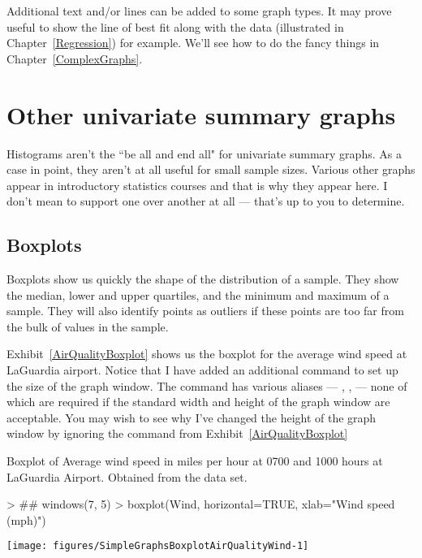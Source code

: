 Additional text and/or lines can be added to some graph types. It may prove useful to show the line of best fit along with the data (illustrated in Chapter~\ref{Regression}) for example. We'll see how to do the fancy things in Chapter~\ref{ComplexGraphs}. 
 
\section{Other univariate summary graphs} 
 
Histograms aren't the ``be all and end all" for univariate summary graphs. As a case in point, they aren't at all useful for small sample sizes. Various other graphs appear in introductory statistics courses and that is why they appear here. I don't mean to support one over another at all --- that's up to you to determine. 
 
\subsection{Boxplots} 
 
Boxplots show us quickly the shape of the distribution of a sample. They show the median, lower and upper quartiles, and the minimum and maximum of a sample. They will also identify points as outliers if these points are too far from the bulk of values in the sample. 
 
Exhibit~\ref{AirQualityBoxplot} shows us the boxplot for the average wind speed at LaGuardia airport. Notice that I have added an additional command to set up the size of the graph window. The  command has various aliases --- , ,  --- none of which are required if the standard width and height of the graph window are acceptable. You may wish to see why I've changed the height of the graph window by ignoring the  command from Exhibit~\ref{AirQualityBoxplot} 
 
\begin{exhibit} 
\begin{center} 
\caption{Boxplot of Average wind speed in miles per hour at 0700 and 1000 hours at LaGuardia Airport. Obtained from the  data set.} 
\label{AirQualityBoxplot} 

\begin{Schunk}
\begin{Sinput}
> ## windows(7, 5)
> boxplot(Wind, horizontal=TRUE, xlab="Wind speed (mph)")
\end{Sinput}
\end{Schunk}
\texttt{[image: figures/SimpleGraphsBoxplotAirQualityWind-1]} 



\end{center} 
\end{exhibit} 
 
